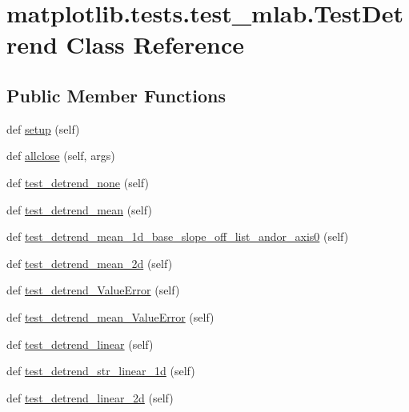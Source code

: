 \hypertarget{classmatplotlib_1_1tests_1_1test__mlab_1_1TestDetrend}{}\section{matplotlib.\+tests.\+test\+\_\+mlab.\+Test\+Detrend Class Reference}
\label{classmatplotlib_1_1tests_1_1test__mlab_1_1TestDetrend}
\subsection*{Public Member Functions}
\begin{DoxyCompactItemize}
\item 
def \hyperlink{classmatplotlib_1_1tests_1_1test__mlab_1_1TestDetrend_acf6e51419812fa99df8a8c5869533627}{setup} (self)
\item 
def \hyperlink{classmatplotlib_1_1tests_1_1test__mlab_1_1TestDetrend_a01e6e811f9be984d7820fbb298e2053b}{allclose} (self, args)
\item 
def \hyperlink{classmatplotlib_1_1tests_1_1test__mlab_1_1TestDetrend_abe911f94dd3f633df7152ec007b54512}{test\+\_\+detrend\+\_\+none} (self)
\item 
def \hyperlink{classmatplotlib_1_1tests_1_1test__mlab_1_1TestDetrend_a40a703880cc43c3af31c946a61400839}{test\+\_\+detrend\+\_\+mean} (self)
\item 
def \hyperlink{classmatplotlib_1_1tests_1_1test__mlab_1_1TestDetrend_af62181745874ebbd29896618fd3823e1}{test\+\_\+detrend\+\_\+mean\+\_\+1d\+\_\+base\+\_\+slope\+\_\+off\+\_\+list\+\_\+andor\+\_\+axis0} (self)
\item 
def \hyperlink{classmatplotlib_1_1tests_1_1test__mlab_1_1TestDetrend_a1c6d6cf9c4b6ba89c5dfc6a64128d094}{test\+\_\+detrend\+\_\+mean\+\_\+2d} (self)
\item 
def \hyperlink{classmatplotlib_1_1tests_1_1test__mlab_1_1TestDetrend_a6beecb709ee32254f417956b7a2cc738}{test\+\_\+detrend\+\_\+\+Value\+Error} (self)
\item 
def \hyperlink{classmatplotlib_1_1tests_1_1test__mlab_1_1TestDetrend_a7f91f974eb88ed354ec48e4891b3d9f9}{test\+\_\+detrend\+\_\+mean\+\_\+\+Value\+Error} (self)
\item 
def \hyperlink{classmatplotlib_1_1tests_1_1test__mlab_1_1TestDetrend_a3968fba18fd72150607e4b6c90fb38b3}{test\+\_\+detrend\+\_\+linear} (self)
\item 
def \hyperlink{classmatplotlib_1_1tests_1_1test__mlab_1_1TestDetrend_a76db4050ec0936212b235e999314718a}{test\+\_\+detrend\+\_\+str\+\_\+linear\+\_\+1d} (self)
\item 
def \hyperlink{classmatplotlib_1_1tests_1_1test__mlab_1_1TestDetrend_a216f0e669e98f4db654b90d76a9ed558}{test\+\_\+detrend\+\_\+linear\+\_\+2d} (self)
\end{DoxyCompactItemize}
